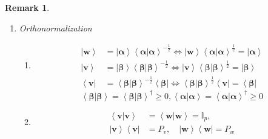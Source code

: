 \documentclass[aps,preprint]{revtex4}%
\newtheorem{remark}[theorem]{Remark}
\begin{document}
\begin{remark}
\begin{enumerate}
\begin{enumerate}
\begin{enumerate}
\end{enumerate}
\end{enumerate}

\item Orthonormalization

\begin{enumerate}
\item
\begin{align}
\left\vert \boldsymbol{w}\right\rangle  &  =\left\vert \boldsymbol{\alpha
}\right\rangle \left\langle \left.  \boldsymbol{\alpha}\right\vert
\boldsymbol{\alpha}\right\rangle ^{-\frac{1}{2}}\Longleftrightarrow\left\vert
\boldsymbol{w}\right\rangle \left\langle \left.  \boldsymbol{\alpha
}\right\vert \boldsymbol{\alpha}\right\rangle ^{\frac{1}{2}}=\left\vert
\boldsymbol{\alpha}\right\rangle \\
\left\vert \boldsymbol{v}\right\rangle  &  =\left\vert \boldsymbol{\beta
}\right\rangle \left\langle \left.  \boldsymbol{\beta}\right\vert
\boldsymbol{\beta}\right\rangle ^{-\frac{1}{2}}\Longleftrightarrow\left\vert
\boldsymbol{v}\right\rangle \left\langle \left.  \boldsymbol{\beta}\right\vert
\boldsymbol{\beta}\right\rangle ^{\frac{1}{2}}=\left\vert \boldsymbol{\beta
}\right\rangle \\
\left\langle \boldsymbol{v}\right\vert  &  =\left\langle \left.
\boldsymbol{\beta}\right\vert \boldsymbol{\beta}\right\rangle ^{-\frac{1}{2}%
}\left\langle \boldsymbol{\beta}\right\vert \Longleftrightarrow\left\langle
\left.  \boldsymbol{\beta}\right\vert \boldsymbol{\beta}\right\rangle
^{\frac{1}{2}}\left\langle \boldsymbol{v}\right\vert =\left\langle
\boldsymbol{\beta}\right\vert
\end{align}%
\begin{equation}
\left\langle \left.  \boldsymbol{\beta}\right\vert \boldsymbol{\beta
}\right\rangle =\left\langle \left.  \boldsymbol{\beta}\right\vert
\boldsymbol{\beta}\right\rangle ^{\dagger}\geq0,\left\langle \left.
\boldsymbol{\alpha}\right\vert \boldsymbol{\alpha}\right\rangle =\left\langle
\left.  \boldsymbol{\alpha}\right\vert \boldsymbol{\alpha}\right\rangle
^{\dagger}\geq0
\end{equation}


\item
\begin{align}
\left\langle \left.  \boldsymbol{v}\right\vert \boldsymbol{v}\right\rangle  &
=\left\langle \left.  \boldsymbol{w}\right\vert \boldsymbol{w}\right\rangle
=\mathbb{I}_{p},\\
\left\vert \boldsymbol{v}\right\rangle \left\langle \boldsymbol{v}\right\vert
&  =P_{v},\quad\left\vert \boldsymbol{w}\right\rangle \left\langle
\boldsymbol{w}\right\vert =P_{w}%
\end{align}



\end{enumerate}
\end{enumerate}
\end{remark}
\end{document}
